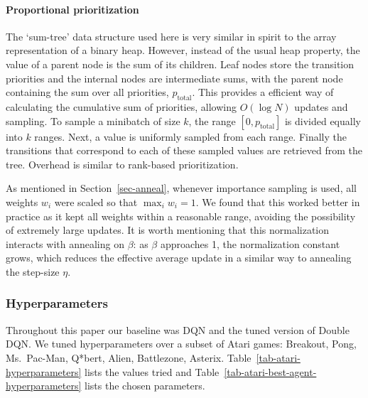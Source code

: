 \documentclass[a4paper]{article}
\begin{document}
\paragraph{Proportional prioritization}
The `sum-tree' data structure used here is very similar in spirit to the array representation of a binary heap.  However, instead of the usual heap property, the value of a parent node is the sum of its children.  Leaf nodes store the transition priorities and the internal nodes are intermediate sums, with the parent node containing the sum over all priorities, $p_{\text{total}}$.  This provides a efficient way of calculating the cumulative sum of priorities, allowing $O(\log N)$ updates and sampling.  To sample a minibatch of size $k$, the range $[0, p_{\text{total}}]$ is divided equally into $k$ ranges.  Next, a value is uniformly sampled from each range.  Finally the transitions that correspond to each of these sampled values are retrieved from the tree.  Overhead is similar to rank-based prioritization.

As mentioned in Section~\ref{sec-anneal}, whenever importance sampling is used, all weights $w_i$ were scaled so that $\max_i w_i = 1$.  We found that this worked better in practice as it kept all weights within a reasonable range, avoiding the possibility of extremely large updates. It is worth mentioning that this normalization interacts with annealing on $\beta$: as $\beta$ approaches 1, the normalization constant grows, which reduces the effective average update in a similar way to annealing the step-size $\eta$.

\subsubsection{Hyperparameters}

Throughout this paper our baseline was DQN and the tuned version of Double DQN.  We tuned hyperparameters over a subset of Atari games: Breakout, Pong, Ms.\ Pac-Man, Q*bert, Alien, Battlezone, Asterix.  Table~\ref{tab-atari-hyperparameters} lists the values tried and Table~\ref{tab-atari-best-agent-hyperparameters} lists the chosen parameters.

\begin{table*}[!hp]
\centering


\caption{
\label{tab-atari-hyperparameters}
Hyperparameters considered in experiments.  Here $\eta_{\text{baseline}} = 0.00025$.
}
\end{table*}
\end{document}

